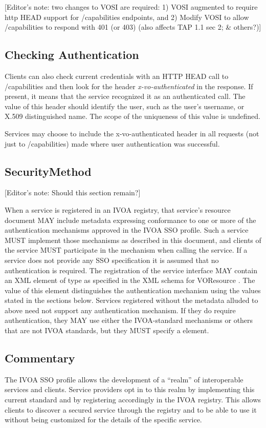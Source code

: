 \documentclass[11pt,a4paper]{ivoa}
\begin{document}
{{{[Editor's note: two changes to VOSI are required: 1) VOSI augmented to require http HEAD support for /capabilities endpoints, and 2) Modify VOSI to allow /capabilities to respond with 401 (or 403) (also affects TAP 1.1 sec 2; & others?)]

\subsection{Checking Authentication}

Clients can also check current credentials with an HTTP HEAD call to /capabilities and then look for the header \emph{x-vo-authenticated} in the response. If present, it means that the service recognized it as an authenticated call.  The value of this header should identify the user, such as the user's username, or X.509 distinguished name.  The scope of the uniqueness of this value is undefined.

Services may choose to include the x-vo-authenticated header in all requests (not just to /capabilities) made where user authentication was successful.

\subsection{SecurityMethod}

[Editor's note: Should this section remain?]

When a service is registered in an IVOA registry, that service's resource document MAY include metadata expressing conformance to one or more of the authentication mechanisms approved in the IVOA SSO profile. Such a service MUST implement those mechanisms as described in this document, and clients of the service MUST participate in the mechanism when calling the service. If a service does not provide any SSO specification it is assumed that no authentication is required.
The registration of the service interface MAY contain an XML element
of type  as specified in the XML schema for
VOResource \citep{2018ivoa.spec.0625P}. The value of this element distinguishes the
authentication mechanism using the values stated in the sections below.
Services registered without the metadata alluded to above need not
support any authentication mechanism. If they do require authentication,
they MAY use either the IVOA-standard mechanisms or others that are not
IVOA standards, but they MUST specify a   element.

\subsection{Commentary}
The IVOA SSO profile allows the development of a ``realm'' of interoperable services and clients.
Service providers opt in to this realm by implementing this current standard and by registering accordingly in the IVOA registry.
This allows clients to discover a secured service through the registry and to be able to use it without
being customized for the details of the specific service.

}}}
\end{document}
